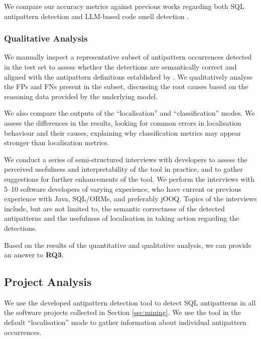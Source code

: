 \documentclass{article}
\begin{document}
We compare our accuracy metrics against previous works regarding both SQL antipattern detection \cites{de2025effectiveness}{nagy2017static} and LLM-based code smell detection \cites{DBLP:conf/sbes/GomesSMP25}{blaauwendraad2025evaluating}{sadik2025benchmarking}{DBLP:conf/esem/SilvaSMAV24}.

\subsubsection{Qualitative Analysis}

We manually inspect a representative subset of antipattern occurrences detected in the test set to assess whether the detections are semantically correct and aligned with the antipattern definitions established by \textcite{karwin2023sql}. We qualitatively analyse the FPs and FNs present in the subset, discussing the root causes based on the reasoning data provided by the underlying model.

We also compare the outputs of the “localisation” and “classification” modes. We assess the differences in the results, looking for common errors in localisation behaviour and their causes, explaining why classification metrics may appear stronger than localisation metrics.

We conduct a series of semi-structured interviews with developers to assess the perceived usefulness and interpretability of the tool in practice, and to gather suggestions for further enhancements of the tool. We perform the interviews with 5–10 software developers of varying experience, who have current or previous experience with Java, SQL/ORMs, and preferably jOOQ. Topics of the interviews include, but are not limited to, the semantic correctness of the detected antipatterns and the usefulness of localisation in taking action regarding the detections.

Based on the results of the quantitative and qualitative analysis, we can provide an answer to \textbf{RQ3}.

\subsection{Project Analysis}\label{sec:projectAnalysis}

We use the developed antipattern detection tool to detect SQL antipatterns in all the software projects collected in Section \ref{sec:mining}. We use the tool in the default “localisation” mode to gather information about individual antipattern occurrences.
\end{document}
